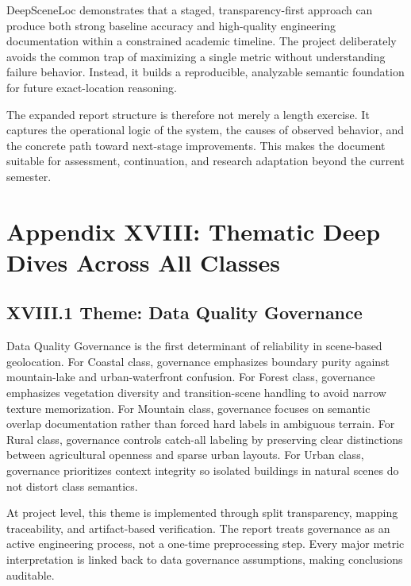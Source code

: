 DeepSceneLoc demonstrates that a staged, transparency-first approach can produce both strong baseline accuracy and high-quality engineering documentation within a constrained academic timeline. The project deliberately avoids the common trap of maximizing a single metric without understanding failure behavior. Instead, it builds a reproducible, analyzable semantic foundation for future exact-location reasoning.

The expanded report structure is therefore not merely a length exercise. It captures the operational logic of the system, the causes of observed behavior, and the concrete path toward next-stage improvements. This makes the document suitable for assessment, continuation, and research adaptation beyond the current semester.

\section*{Appendix XVIII: Thematic Deep Dives Across All Classes}

\subsection*{XVIII.1 Theme: Data Quality Governance}
Data Quality Governance is the first determinant of reliability in scene-based geolocation. For Coastal class, governance emphasizes boundary purity against mountain-lake and urban-waterfront confusion. For Forest class, governance emphasizes vegetation diversity and transition-scene handling to avoid narrow texture memorization. For Mountain class, governance focuses on semantic overlap documentation rather than forced hard labels in ambiguous terrain. For Rural class, governance controls catch-all labeling by preserving clear distinctions between agricultural openness and sparse urban layouts. For Urban class, governance prioritizes context integrity so isolated buildings in natural scenes do not distort class semantics.

At project level, this theme is implemented through split transparency, mapping traceability, and artifact-based verification. The report treats governance as an active engineering process, not a one-time preprocessing step. Every major metric interpretation is linked back to data governance assumptions, making conclusions auditable.

